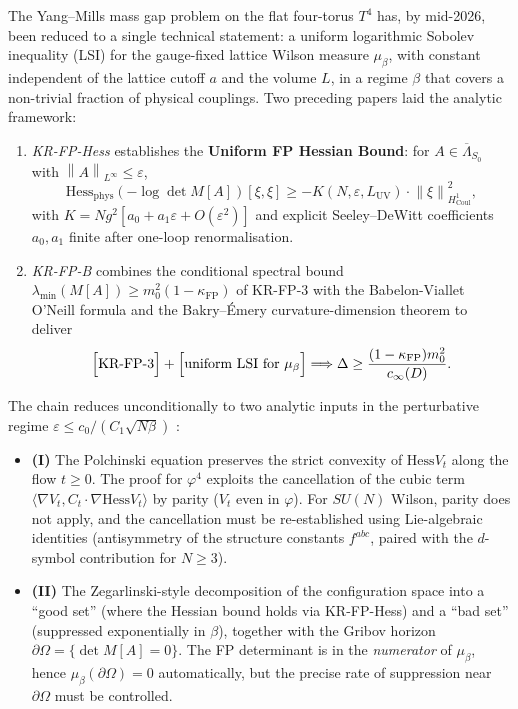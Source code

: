 \documentclass[11pt,a4paper]{amsart}
\theoremstyle{definition}
\newcommand{\norm}[1]{\left\lVert#1\right\rVert}
\newcommand{\Coul}{\mathrm{Coul}}
\newcommand{\Hess}{\mathrm{Hess}}
\newcommand{\kFP}{\kappa_{\mathrm{FP}}}
\begin{document}
The Yang--Mills mass gap problem \cite{JaffeWitten2000} on the flat
four-torus $T^4$ has, by mid-2026, been reduced to a single technical
statement: a uniform logarithmic Sobolev inequality (LSI) for the
gauge-fixed lattice Wilson measure $\mu_\beta$, with constant independent
of the lattice cutoff $a$ and the volume $L$, in a regime $\beta$ that
covers a non-trivial fraction of physical couplings. Two preceding
papers laid the analytic framework:
\begin{enumerate}[label=(\Alph*),leftmargin=2em]
\item \emph{KR-FP-Hess} \cite{RemondiereFPHess_2026} establishes the
\textbf{Uniform FP Hessian Bound}: for $A \in \overline\Lambda_{S_0}$ with
$\norm{A}_{L^\infty} \leq \varepsilon$,
\[
\Hess_{\mathrm{phys}}(-\log\det M[A])[\xi,\xi]
\geq -K(N,\varepsilon,L_{\mathrm{UV}}) \cdot \norm{\xi}^2_{H^1_{\Coul}},
\]
with $K = N g^2 [a_0 + a_1 \varepsilon + O(\varepsilon^2)]$ and explicit
Seeley--DeWitt coefficients $a_0, a_1$ finite after one-loop renormalisation.
\item \emph{KR-FP-B} \cite{RemondiereKRFPBakryEmery_2026} combines the
conditional spectral bound $\lambda_{\min}(M[A]) \geq m_0^2(1-\kFP)$ of
KR-FP-3 \cite{RemondiereKRFP3_2026} with the Babelon-Viallet O'Neill
formula and the Bakry--\'Emery curvature-dimension theorem to deliver
\[
\Bigl[\text{KR-FP-3}\Bigr] + \Bigl[\text{uniform LSI for } \mu_\beta\Bigr]
\Longrightarrow \Delta \geq \frac{(1-\kFP) m_0^2}{c_\infty(D)}.
\]
\end{enumerate}

\noindent The chain reduces unconditionally to two analytic inputs in
the perturbative regime $\varepsilon \leq c_0/(C_1 \sqrt{N\beta})$
\cite{RemondiereFPHess_2026}:
\begin{itemize}[leftmargin=2em]
\item \textbf{(I)} The Polchinski equation \cite{BauerschmidtBodineauDagallier2024,
Polchinski1984} preserves the strict convexity of $\Hess V_t$ along the
flow $t \geq 0$. The proof for $\varphi^4$ \cite[\S 4]{BauerschmidtDagallier2024}
exploits the cancellation of the cubic term $\langle \nabla V_t, C_t \cdot
\nabla \Hess V_t\rangle$ by parity ($V_t$ even in $\varphi$). For $SU(N)$
Wilson, parity does not apply, and the cancellation must be re-established
using Lie-algebraic identities (antisymmetry of the structure constants
$f^{abc}$, paired with the $d$-symbol contribution for $N \geq 3$).
\item \textbf{(II)} The Zegarlinski-style \cite{Zegarlinski1996} decomposition
of the configuration space into a ``good set'' (where the Hessian bound
holds via KR-FP-Hess) and a ``bad set'' (suppressed exponentially in $\beta$),
together with the Gribov horizon $\partial \Omega = \{\det M[A] = 0\}$.
The FP determinant is in the \emph{numerator} of $\mu_\beta$, hence
$\mu_\beta(\partial\Omega) = 0$ automatically, but the precise rate of
suppression near $\partial \Omega$ must be controlled.
\end{itemize}
\end{document}
